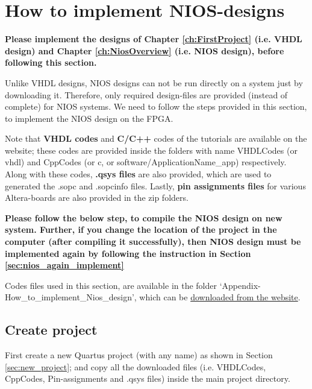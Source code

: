\chapter{How to implement NIOS-designs}\label{NiosQuartusModelsim}

\graphicspath{{BackMatters/Appendix/NiosOverview/}}

\textbf{Please implement the designs of Chapter \ref{ch:FirstProject} (i.e. VHDL design) and Chapter \ref{ch:NiosOverview} (i.e. NIOS design), before following this section.}

Unlike VHDL designs, NIOS designs can not be run directly on a system just by downloading it. Therefore, only required design-files are provided (instead of complete) for NIOS systems. We need to follow the steps provided in this section, to implement the NIOS design on the FPGA. 

Note that \textbf{VHDL codes} and \textbf{C/C++} codes of the tutorials are available on the website; these codes are provided inside the folders with name VHDLCodes (or vhdl) and CppCodes (or c, or software/ApplicationName\_app) respectively. Along with these codes, \textbf{.qsys files} are also provided, which are used to generated the .sopc and .sopcinfo files. Lastly, \textbf{pin assignments files} for various Altera-boards are also provided in the zip folders. 

\textbf{Please follow the below step, to compile the NIOS design on new system. Further, if you change the location of the project in the computer (after compiling it successfully), then NIOS design must be implemented again by following the instruction in Section \ref{sec:nios_again_implement}}

\begin{noNumBox}
Codes files used in this section, are available in the folder `Appendix-How\_to\_implement\_Nios\_design', which can be \href{http://pythondsp.readthedocs.io/en/latest/pythondsp/toc.html}{downloaded from the website}. 
\end{noNumBox}

\section{Create project} \label{app:CreateProject}
First create a new Quartus project (with any name) as shown in Section \ref{sec:new_project}; and copy all the downloaded files (i.e. VHDLCodes, CppCodes, Pin-assignments  and .qsys files) inside the main project directory. 


